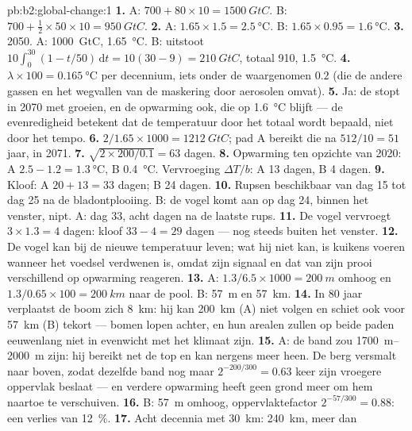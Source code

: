 \begin{solution}{pb:b2:global-change:1}
\textbf{1.} A: $700 + 80\times 10 = \qty{1500}{GtC}$. B: $700 +
\tfrac12\times 50\times 10 = \qty{950}{GtC}$.
\textbf{2.} A: $1.65\times 1.5 = \qty{2.5}{\celsius}$. B:
$1.65\times 0.95 = \qty{1.6}{\celsius}$.
\textbf{3.} 2050. A: \qty{1000}{GtC}, \qty{1.65}{\celsius}. B:
uitstoot $10\int_0^{30}(1 - t/50)\,\mathrm{d}t = 10(30 - 9) =
\qty{210}{GtC}$, totaal 910, \qty{1.5}{\celsius}.
\textbf{4.} $\lambda\times 100 = \qty{0.165}{\celsius}$ per decennium,
iets onder de waargenomen $0.2$ (die de andere gassen en het wegvallen van de
maskering door aerosolen omvat).
\textbf{5.} Ja: de  stopt in 2070 met groeien, en de
opwarming ook, die op \qty{1.6}{\celsius} blijft --- de
evenredigheid betekent dat de temperatuur door het totaal wordt bepaald, niet
door het tempo.
\textbf{6.} $2/1.65\times 1000 = \qty{1212}{GtC}$; pad A bereikt die
na $512/10 = 51$ jaar, in 2071.
\textbf{7.} $\sqrt{2\times 200/0.1} = 63$ dagen.
\textbf{8.} Opwarming ten opzichte van 2020: A $2.5 - 1.2 =
\qty{1.3}{\celsius}$, B \qty{0.4}{\celsius}. Vervroeging $\Delta T/b$:
A 13 dagen, B 4 dagen.
\textbf{9.} Kloof: A $20 + 13 = 33$ dagen; B 24 dagen.
\textbf{10.} Rupsen beschikbaar van dag 15 tot dag 25 na de
bladontplooiing. B: de vogel komt aan op dag 24, binnen het venster, nipt.
A: dag 33, acht dagen na de laatste rups.
\textbf{11.} De vogel vervroegt $3\times 1.3 = 4$ dagen: kloof $33 - 4 =
29$ dagen --- nog steeds buiten het venster.
\textbf{12.} De vogel kan bij de nieuwe temperatuur leven; wat hij
niet kan, is kuikens voeren wanneer het voedsel verdwenen is, omdat zijn signaal
en dat van zijn prooi verschillend op opwarming reageren.
\textbf{13.} A: $1.3/6.5\times 1000 = \qty{200}{m}$ omhoog en
$1.3/0.65\times 100 = \qty{200}{km}$ naar de pool. B: \qty{57}{m} en
\qty{57}{km}.
\textbf{14.} In 80 jaar verplaatst de boom zich \qty{8}{km}: hij kan
\qty{200}{km} (A) niet volgen en schiet ook voor \qty{57}{km} (B) tekort ---
bomen lopen achter, en hun arealen zullen op beide paden eeuwenlang niet in
evenwicht met het klimaat zijn.
\textbf{15.} A: de band zou \qtyrange{1700}{2000}{m} zijn: hij
bereikt net de top en kan nergens meer heen. De berg versmalt naar boven,
zodat dezelfde band nog maar $2^{-200/300} = 0.63$ keer zijn vroegere
oppervlak beslaat --- en verdere opwarming heeft geen grond meer om hem
naartoe te verschuiven.
\textbf{16.} B: \qty{57}{m} omhoog, oppervlaktefactor $2^{-57/300} = 0.88$: een
verlies van \qty{12}{\%}.
\textbf{17.} Acht decennia met \qty{30}{km}: \qty{240}{km}, meer dan

\end{solution}
